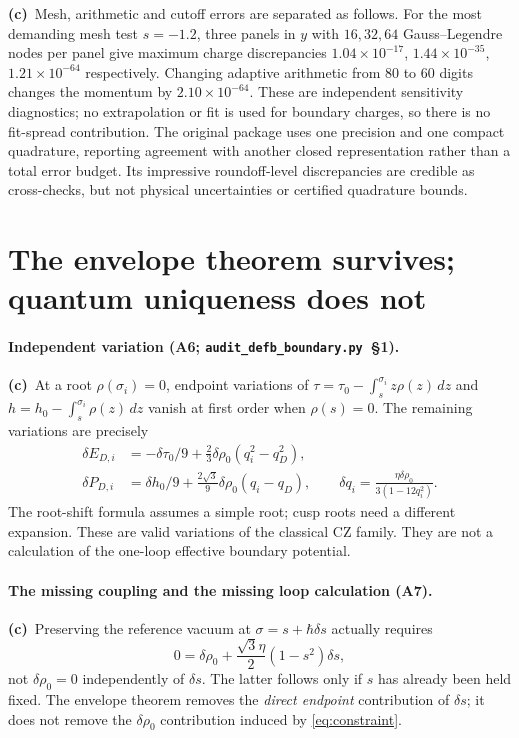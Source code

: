 \documentclass[11pt,a4paper]{article}
\newcommand{\Lc}{\textbf{(c)}\ }
\newcommand{\scr}{\texttt{audit\_\allowbreak defb\_\allowbreak boundary.py}}
\begin{document}
\Lc Mesh, arithmetic and cutoff errors are separated as follows. For the
most demanding mesh test $s=-1.2$, three panels in $y$ with $16,32,64$
Gauss--Legendre nodes per panel give maximum charge discrepancies
$1.04\times10^{-17}$, $1.44\times10^{-35}$,
$1.21\times10^{-64}$ respectively. Changing adaptive arithmetic from 80 to
60 digits changes the momentum by $2.10\times10^{-64}$. These are independent
sensitivity diagnostics; no extrapolation or fit is used for boundary
charges, so there is no fit-spread contribution. The original package uses
one precision and one compact quadrature, reporting agreement with another
closed representation rather than a total error budget. Its impressive
roundoff-level discrepancies are credible as cross-checks, but not physical
uncertainties or certified quadrature bounds.

\section{The envelope theorem survives; quantum uniqueness does not}
\paragraph{Independent variation (A6; \scr\ §1).}
\Lc At a root $\rho(\sigma_i)=0$, endpoint variations of
$\tau=\tau_0-\int_s^{\sigma_i}z\rho(z)\,dz$ and
$h=h_0-\int_s^{\sigma_i}\rho(z)\,dz$ vanish at first order when
$\rho(s)=0$. The remaining variations are precisely
\begin{align}
 \delta E_{D,i}&=-\delta\tau_0/9+
       \tfrac23\delta\rho_0(q_i^2-q_D^2),\\
 \delta P_{D,i}&=\delta h_0/9+
       \tfrac{2\sqrt3}{9}\delta\rho_0(q_i-q_D),\qquad
 \delta q_i=\frac{\eta\delta\rho_0}{3(1-12q_i^2)}.
\end{align}
The root-shift formula assumes a simple root; cusp roots need a different
expansion. These are valid variations of the classical CZ family. They
are not a calculation of the one-loop effective boundary potential.

\paragraph{The missing coupling and the missing loop calculation (A7).}
\Lc Preserving the reference vacuum at $\sigma=s+\hbar\delta s$ actually
requires
\begin{equation}
 0=\delta\rho_0+\frac{\sqrt3\eta}{2}(1-s^2)\delta s,
 \label{eq:constraint}
\end{equation}
not $\delta\rho_0=0$ independently of $\delta s$. The latter follows only
if $s$ has already been held fixed. The envelope theorem removes the
\emph{direct endpoint} contribution of $\delta s$; it does not remove the
$\delta\rho_0$ contribution induced by \eqref{eq:constraint}.
\end{document}
